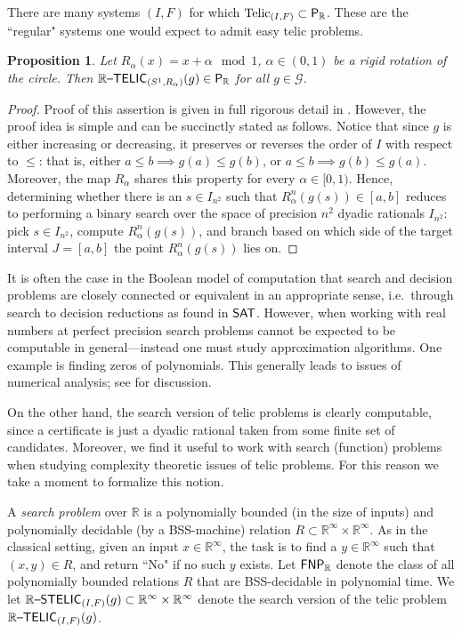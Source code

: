 \documentclass{amsart}
\theoremstyle{theorem}
\newtheorem{proposition}[theorem]{Proposition}
\theoremstyle{remark}
\DeclareMathOperator{\Telic}{Telic}
\newcommand{\RR}{\mathbb{R}}
\newcommand{\ccP}{\textsf{\upshape P}}
\newcommand{\ccSAT}{\textsf{\upshape SAT}}
\newcommand{\ccFNP}{\textsf{\upshape FNP}}
\newcommand{\ccRTELIC}{\mathbb{R}\textsf{\upshape --TELIC}}
\newcommand{\ccRSTELIC}{\mathbb{R}\textsf{\upshape --STELIC}}
\newcommand{\cG}{\mathcal{G}}
\begin{document}
There are many systems $(I, F)$ for which $\Telic_{(I, F)} \subset \ccP_\RR$. These are the ``regular" systems one would expect to admit easy telic problems.

\begin{proposition}\label{propRotationInP}
Let $R_\alpha(x) = x+\alpha \mod 1$, $\alpha \in (0,1)$ be a rigid rotation of the circle.
Then $\ccRTELIC_{(S^1, R_\alpha)}(g) \in \ccP_\RR$ for all $g \in \cG$.
\end{proposition}
\begin{proof}
Proof of this assertion is given in full rigorous detail in \cite{everett1}. However, the proof idea is simple and can be succinctly stated as follows. Notice that since $g$ is either increasing or decreasing, it preserves or reverses the order of $I$ with respect to $\leq$: that is, either $a\le b\implies g(a)\le g(b)$, or $a\le b\implies g(b)\le g(a)$. Moreover, the map $R_\alpha$ shares this property for every $\alpha \in [0,1)$. Hence, determining whether there is an $s \in I_{n^2}$ such that $R_\alpha^n(g(s)) \in [a, b]$ reduces to performing a binary search over the space of precision $n^2$ dyadic rationals $I_{n^2}$: pick $s \in I_{n^2}$, compute $R_\alpha^n(g(s))$, and branch based on which side of the target interval $J = [a, b]$ the point $R_\alpha^n(g(s))$ lies on.
\end{proof}

It is often the case in the Boolean model of computation that search and decision problems are closely connected or equivalent in an appropriate sense, i.e.\ through search to decision reductions as found in $\ccSAT$.
However, when working with real numbers at perfect precision search problems cannot be expected to be computable in general---instead one must study approximation algorithms. One example is finding zeros of polynomials. This generally leads to issues of numerical analysis; see \cite{blum2012complexity} for discussion.

On the other hand, the search version of telic problems is clearly computable, since a certificate is just a dyadic rational taken from some finite set of candidates. Moreover, we find it useful to work with search (function) problems when studying complexity theoretic issues of telic problems. For this reason we take a moment to formalize this notion.

A \emph{search problem} over $\RR$ is a polynomially bounded (in the size of inputs) and polynomially decidable (by a BSS-machine) relation  $R\subset \RR^\infty \times \RR^\infty$. As in the classical setting, given an input $x \in \RR^\infty$, the task is to find a $y \in \RR^\infty$ such that $(x, y) \in R$, and return ``No" if no such $y$ exists. Let $\ccFNP_\RR$ denote the class of all polynomially bounded relations $R$ that are BSS-decidable in polynomial time. We let $\ccRSTELIC_{(I, F)}(g) \subset \RR^\infty \times \RR^\infty$ denote the search version of the telic problem $\ccRTELIC_{(I, F)}(g)$.
\end{document}
